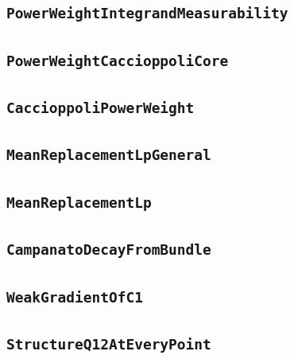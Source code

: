 \documentclass[11pt]{amsart}
\theoremstyle{definition}
\begin{document}
\subsection{\texorpdfstring{\texttt{PowerWeightIntegrandMeasurability}}{PowerWeightIntegrandMeasurability}}\label{node:PowerWeightIntegrandMeasurability}


\subsection{\texorpdfstring{\texttt{PowerWeightCaccioppoliCore}}{PowerWeightCaccioppoliCore}}\label{node:PowerWeightCaccioppoliCore}


\subsection{\texorpdfstring{\texttt{CaccioppoliPowerWeight}}{CaccioppoliPowerWeight}}\label{node:CaccioppoliPowerWeight}


\subsection{\texorpdfstring{\texttt{MeanReplacementLpGeneral}}{MeanReplacementLpGeneral}}\label{node:MeanReplacementLpGeneral}


\subsection{\texorpdfstring{\texttt{MeanReplacementLp}}{MeanReplacementLp}}\label{node:MeanReplacementLp}


\subsection{\texorpdfstring{\texttt{CampanatoDecayFromBundle}}{CampanatoDecayFromBundle}}\label{node:CampanatoDecayFromBundle}


\subsection{\texorpdfstring{\texttt{WeakGradientOfC1}}{WeakGradientOfC1}}\label{node:WeakGradientOfC1}


\subsection{\texorpdfstring{\texttt{StructureQ12AtEveryPoint}}{StructureQ12AtEveryPoint}}\label{node:StructureQ12AtEveryPoint}

\end{document}
